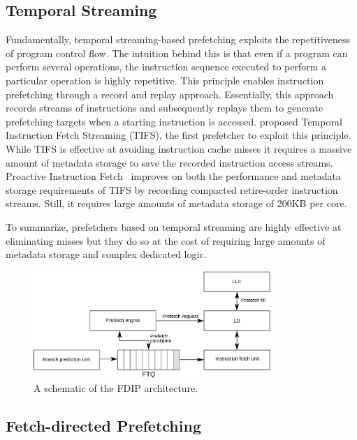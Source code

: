 \documentclass[../main.tex]{subfiles}
\begin{document}
\begin{refsection}
\subsection{Temporal Streaming} Fundamentally, temporal streaming-based prefetching exploits the repetitiveness of program control
flow. The intuition behind this is that even if a program can perform
several operations, the instruction sequence executed to perform a
particular operation is highly repetitive. This principle enables
instruction prefetching through a record and replay
approach. Essentially, this approach records streams of instructions
and subsequently replays them to generate prefetching targets when a
starting instruction is accessed. \textcite{ferdman08_tempor} proposed
Temporal Instruction Fetch Streaming (TIFS), the first prefetcher to
exploit this principle. While TIFS is effective at avoiding
instruction cache misses it requires a massive amount of metadata
storage to save the recorded instruction access streams.  Proactive
Instruction Fetch~\cite{ferdman11_proac_instr_fetch} improves on both
the performance and metadata storage requirements of TIFS by recording
compacted retire-order instruction streams. Still, it requires large
amounts of metadata storage of 200KB per core.  %

To summarize, prefetchers based on temporal streaming are highly
effective at eliminating  misses but they do so at the cost of
requiring large amounts of metadata storage and complex dedicated
logic.

\begin{figure}[ht]
  \centering
  \includegraphics[width=0.8\textwidth]{figures/fdip1.pdf}
  \caption{\label{fig:fdip} A schematic of the FDIP architecture.}
\end{figure}

\subsection{Fetch-directed Prefetching}


\end{refsection}
\end{document}

